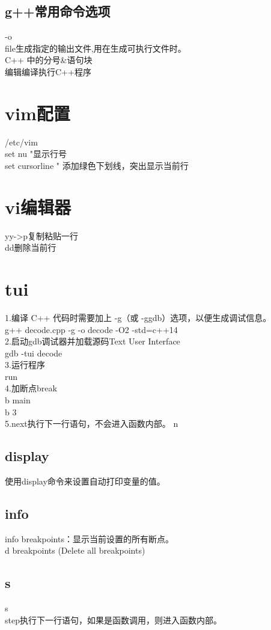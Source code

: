 \documentclass[12pt,twiside,a4paper]{book}
\numberwithin{chapter}{part}
\begin{document}
\subsection{g++常用命令选项}
-o\\
file生成指定的输出文件,用在生成可执行文件时。\\
C++ 中的分号\&语句块\\
编辑编译执行C++程序

\section{vim配置}
/etc/vim\\
set nu "显示行号\\
set cursorline " 添加绿色下划线，突出显示当前行

\section{vi编辑器}
yy->p复制粘贴一行\\
dd删除当前行

\section{tui}
1.编译 C++ 代码时需要加上 -g（或 -ggdb）选项，以便生成调试信息。\\
g++ decode.cpp -g -o decode -O2 -std=c++14 \\
2.启动gdb调试器并加载源码Text User Interface\\
gdb -tui decode\\
3.运行程序\\
run\\
4.加断点break\\
b main\\
b 3\\
5.next执行下一行语句，不会进入函数内部。
n\\
\subsection{display}
使用display命令来设置自动打印变量的值。
\subsection{info}
info breakpoints：显示当前设置的所有断点。\\
d breakpoints (Delete all breakpoints)
\subsection{s}
s\\
step执行下一行语句，如果是函数调用，则进入函数内部。
\end{document}
